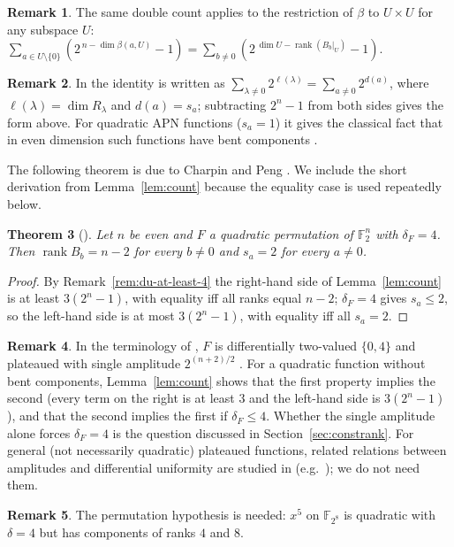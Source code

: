\documentclass[11pt]{article}
\newtheorem{theorem}{Theorem}
\theoremstyle{definition}
\newtheorem{remark}[theorem]{Remark}
\newcommand{\F}{\mathbb{F}}
\DeclareMathOperator{\rk}{rank}
\begin{document}
\begin{remark}\label{rem:count-general}
The same double count applies to the restriction of $\beta$ to $U\times U$ for any subspace $U$:
$\sum_{a\in U\setminus\{0\}}(2^{\,n-\dim\beta(a,U)}-1)=\sum_{b\neq0}(2^{\,\dim U-\rk(B_b|_U)}-1)$.
\end{remark}
\begin{remark}
In \cite{CP19} the identity is written as $\sum_{\lambda\neq0}2^{\ell(\lambda)}=\sum_{a\neq0}2^{d(a)}$,
where $\ell(\lambda)=\dim R_\lambda$ and $d(a)=s_a$; subtracting $2^n-1$ from both sides gives
the form above. For quadratic APN functions ($s_a=1$) it gives the classical fact that in even
dimension such functions have bent components \cite[Remark~3]{CP19}.
\end{remark}

The following theorem is due to Charpin and Peng \cite[Theorem~1, Lemma~4 and
Theorem~7]{CP19}. We include the short derivation from Lemma~\ref{lem:count} because the
equality case is used repeatedly below.
\begin{theorem}[\cite{CP19}]\label{thm:constrank}
Let $n$ be even and $F$ a quadratic permutation of $\F_2^n$ with $\delta_F=4$. Then
$\rk B_b=n-2$ for every $b\neq 0$ and $s_a=2$ for every $a\neq 0$.
\end{theorem}
\begin{proof}
By Remark~\ref{rem:du-at-least-4} the right-hand side of Lemma~\ref{lem:count} is at least
$3(2^n-1)$, with equality iff all ranks equal $n-2$; $\delta_F=4$ gives $s_a\le 2$, so the
left-hand side is at most $3(2^n-1)$, with equality iff all $s_a=2$.
\end{proof}
\begin{remark}
In the terminology of \cite{CP19}, $F$ is differentially two-valued $\{0,4\}$ and plateaued with
single amplitude $2^{(n+2)/2}$ \cite[Theorem~7]{CP19}. For a quadratic function without bent
components, Lemma~\ref{lem:count} shows that the first property implies the second (every term
on the right is at least $3$ and the left-hand side is $3(2^n-1)$), and that the second implies
the first if $\delta_F\le4$. Whether the single amplitude alone forces $\delta_F=4$ is the
question discussed in Section~\ref{sec:constrank}. For general (not necessarily quadratic)
plateaued functions, related relations between amplitudes and differential uniformity are
studied in \cite{KP} (e.g.\ \cite[Theorem~5.6]{KP}); we do not need them.
\end{remark}

\begin{remark}
The permutation hypothesis is needed: $x^5$ on $\F_{2^8}$ is quadratic with
$\delta=4$ but has components of ranks $4$ and $8$.
\end{remark}
\end{document}

